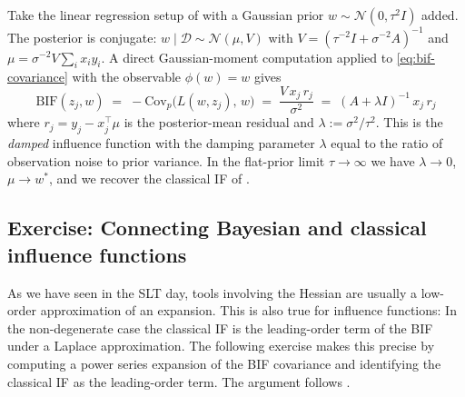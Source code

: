 \documentclass[11pt]{article}
\begin{document}
\begin{example}\label{ex:bayesian-ols}
Take the linear regression setup of  with a Gaussian prior $w\sim\mathcal{N}(0,\tau^2I)$ added. The posterior is conjugate: $w\mid\mathcal{D}\sim\mathcal{N}(\mu,V)$ with $V = (\tau^{-2}I + \sigma^{-2}A)^{-1}$ and $\mu = \sigma^{-2}V\sum_i x_i y_i$. A direct Gaussian-moment computation applied to \eqref{eq:bif-covariance} with the observable $\phi(w) = w$ gives
\[
  \mathrm{BIF}(z_j, w) \;=\; -\mathrm{Cov}_p\bigl(L(w,z_j),\,w\bigr) \;=\; \frac{V\, x_j\, r_j}{\sigma^2} \;=\; (A + \lambda I)^{-1}\,x_j\,r_j
\]
where $r_j = y_j - x_j^\top\mu$ is the posterior-mean residual and $\lambda := \sigma^2/\tau^2$.
This is the \emph{damped} influence function with the damping parameter $\lambda$ equal to the ratio of observation noise to prior variance. In the flat-prior limit $\tau\to\infty$ we have $\lambda\to 0$, $\mu\to w^*$, and we recover the classical IF of .
\end{example}

\subsection{Exercise: Connecting Bayesian and classical influence functions}\label{subsec:bif-if-connection}
As we have seen in the SLT day, tools involving the Hessian are usually a low-order approximation of an expansion. This is also true for influence functions: In the non-degenerate case the classical IF is the leading-order term of the BIF under a Laplace approximation. The following exercise makes this precise by computing a power series expansion of the BIF covariance and identifying the classical IF as the leading-order term. The argument follows \citet[Appendix~A]{kreer2025bif}.
\end{document}
